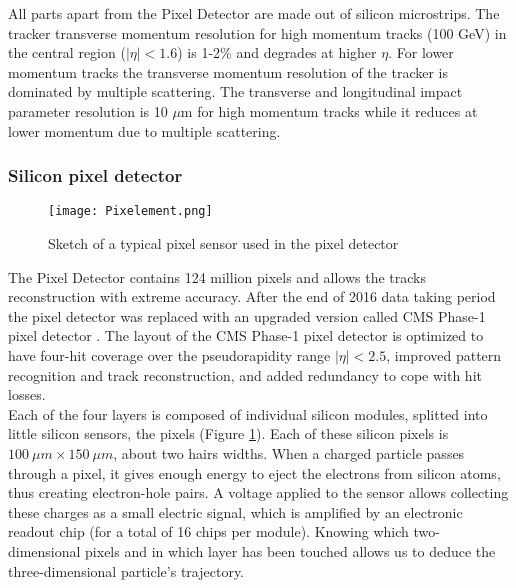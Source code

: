All parts apart from the Pixel Detector are made out of silicon microstrips. The tracker transverse momentum resolution for high momentum tracks (100 GeV) in the central region ($|\eta| < 1.6$) is 1-2\% and degrades at higher $\eta$. For lower momentum tracks the transverse momentum resolution of the tracker is dominated by multiple scattering. The transverse and longitudinal impact parameter resolution is 10 $\mu$m for high momentum tracks while it reduces at lower momentum due to multiple scattering.

\subsubsection{\label{subsubsec:exp_CMS_pixel} Silicon pixel detector}
\begin{figure}[H]
    \centering
    \texttt{[image: Pixelement.png]}
    \caption{Sketch of a typical pixel sensor used in the pixel detector \cite{Silicon_Pixels}}
    \label{fig:Silicon_pixel}
\end{figure}
\noindent The Pixel Detector contains 124 million pixels and allows the tracks reconstruction with extreme accuracy. After the end of 2016 data taking period the pixel detector was replaced with an upgraded version called CMS Phase-1 pixel detector \cite{Adam_2021, Dominguez:1481838}. The layout of the CMS Phase-1 pixel detector is optimized to have four-hit coverage over the pseudorapidity range $|\eta| < 2.5$, improved pattern recognition and track reconstruction, and added redundancy to cope with hit losses.\\
\indent Each of the four layers is composed of individual silicon modules, splitted into little silicon sensors, the pixels (Figure \ref{fig:Silicon_pixel}). Each of these silicon pixels is $100\: \mu m \times 150\: \mu m$, about two hairs widths. When a charged particle passes through a pixel, it gives enough energy to eject the electrons from silicon atoms, thus creating electron-hole pairs. A voltage applied to the sensor allows collecting these charges as a small electric signal, which is amplified by an electronic readout chip (for a total of 16 chips per module). Knowing which two-dimensional pixels and in which layer has been touched allows us to deduce the three-dimensional particle’s trajectory.
